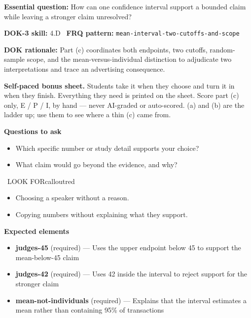\documentclass[11pt]{article}
\begin{document}
\textbf{Essential question:} How can one confidence interval support a bounded claim while leaving a stronger claim unresolved?\par
\textbf{DOK-3 skill:} 4.D \textperiodcentered\ \textbf{FRQ pattern:} {\small\texttt{mean-\allowbreak{}interval-\allowbreak{}two-\allowbreak{}cutoffs-\allowbreak{}and-\allowbreak{}scope}}\par
\textbf{DOK rationale:} Part (c) coordinates both endpoints, two cutoffs, random-sample scope, and the mean-versus-individual distinction to adjudicate two interpretations and trace an advertising consequence.\par

\textbf{Self-paced bonus sheet.} Students take it when they choose and turn it in when they finish. Everything they need is printed on the sheet. Score part (c) only, E / P / I, by hand --- never AI-graded or auto-scored. (a) and (b) are the ladder up; use them to see where a thin (c) came from.\par

\textbf{Questions to ask}
\begin{itemize}[leftmargin=1.5em,itemsep=2pt,topsep=2pt]
  \item Which specific number or study detail supports your choice?
  \item What claim would go beyond the evidence, and why?
\end{itemize}

\begin{callout}{\IconWarn\ LOOK FOR}{calloutred}
\begin{itemize}[leftmargin=1.5em,itemsep=2pt,topsep=2pt]
  \item Choosing a speaker without a reason.
  \item Copying numbers without explaining what they support.
\end{itemize}
\end{callout}


\textbf{Expected elements}
\begin{itemize}[leftmargin=1.5em,itemsep=2pt,topsep=2pt]
  \item \textbf{judges-45} (required) --- Uses the upper endpoint below 45 to support the mean-below-45 claim
  \item \textbf{judges-42} (required) --- Uses 42 inside the interval to reject support for the stronger claim
  \item \textbf{mean-not-individuals} (required) --- Explains that the interval estimates a mean rather than containing 95\% of transactions
\end{itemize}
\end{document}
